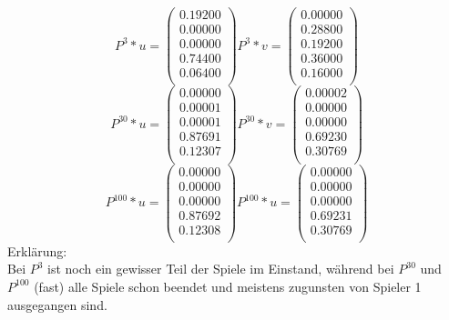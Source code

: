 \documentclass{article}
\begin{document}
\[
P^3 * u=
  \begin{pmatrix}
    0.19200 \\
    0.00000 \\
    0.00000 \\
    0.74400 \\
    0.06400 \\
  \end{pmatrix}
P^3 * v=
  \begin{pmatrix}
    0.00000 \\
    0.28800 \\
    0.19200 \\
    0.36000 \\
    0.16000 \\
    
  \end{pmatrix}
\]
\[
P^{30} * u=
  \begin{pmatrix}
    0.00000 \\
    0.00001 \\
    0.00001 \\
    0.87691 \\
    0.12307 \\
    
  \end{pmatrix}
P^{30} * v=
  \begin{pmatrix}
    0.00002 \\
    0.00000 \\
    0.00000 \\
    0.69230 \\
    0.30769 \\
    
  \end{pmatrix}
\]
\[
P^{100} * u=
  \begin{pmatrix}
    0.00000 \\
    0.00000 \\
    0.00000 \\
    0.87692 \\
    0.12308 \\
    
  \end{pmatrix}
P^{100} * u=
  \begin{pmatrix}
   0.00000 \\
   0.00000 \\
   0.00000 \\
   0.69231 \\
   0.30769 \\
    
  \end{pmatrix}
\]
Erklärung: \\
Bei $P^3$ ist noch ein gewisser Teil der Spiele im Einstand, während bei $P^{30}$ und $P^{100}$ (fast) alle Spiele schon beendet und meistens zugunsten von Spieler 1 ausgegangen sind.
\end{document}
